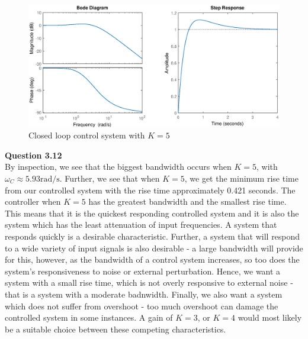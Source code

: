 \documentclass{article}
\begin{document}
	\begin{figure}[h]
		\centering
		\includegraphics[scale=0.5]{fig6.eps}
		\caption{Closed loop control system with $K = 5$}
	\end{figure}
	
	\newpage
	
	\textbf{Question 3.12}\\
	
	By inspection, we see that the biggest bandwidth occurs when $K = 5$, with $\omega_C \approx 5.93 \si{\radian\per\second}$. Further, we see that when $K = 5$, we get the minimum rise time from our controlled system with the rise time approximately 0.421 seconds. The controller when $K = 5$ has the greatest bandwidth and the smallest rise time. This means that it is the quickest responding controlled system and it is also the system which has the least attenuation of input frequencies. A system that responds quickly is a desirable characteristic. Further, a system that will respond to a wide variety of input signals is also desirable - a large bandwidth will provide for this, however, as the bandwidth of a control system increases, so too does the system's responsiveness to noise or external perturbation. Hence, we want a system with a small rise time, which is not overly responsive to external noise - that is a system with a moderate badnwidth. Finally, we also want a system which does not suffer from overshoot - too much overshoot can damage the controlled system in some instances. A gain of $K = 3$, or $K = 4$ would most likely be a suitable choice between these competing characteristics.
	
	\newpage
	
\end{document}

